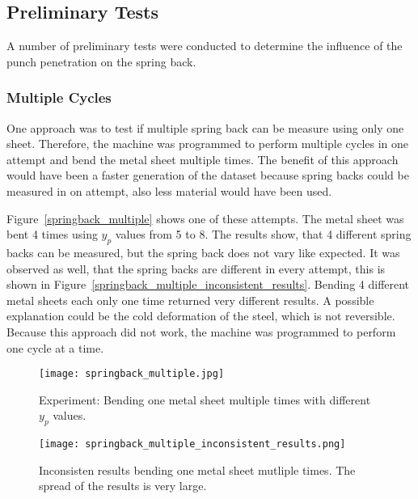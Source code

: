 \subsection{Preliminary Tests}
A number of preliminary tests were conducted to determine the influence of the punch penetration on the spring back.

\subsubsection{Multiple Cycles}
One approach was to test if multiple spring back can be measure using only one sheet.
Therefore, the machine was programmed to perform multiple cycles in one attempt and bend the metal sheet multiple
times. The benefit of this approach would have been a faster generation of the dataset because spring backs could be
measured in on attempt, also less material would have been used.

Figure~\ref{springback_multiple} shows one of these attempts. The metal sheet was bent 4 times using $y_p$ values
from 5 to 8. The results show, that 4 different spring backs can be measured, but the spring back does not vary like
expected. It was observed as well, that the spring backs are different in every attempt, this is shown in
Figure~\ref{springback_multiple_inconsistent_results}.
Bending 4 different metal sheets each only one time returned very different results.
A possible explanation could be the cold deformation of the steel, which is not reversible. Because this approach did
not work, the machine was programmed to perform one cycle at a time.

\captionsetup{width=0.45\textwidth}

\begin{figure}[H]
    \centering
    \begin{minipage}[b]{0.5\textwidth}
        \centering
        \texttt{[image: springback\_multiple.jpg]} %
        \caption{Experiment: Bending one metal sheet multiple times with different $y_p$ values.}
        \label{springback_multiple}
    \end{minipage}\hfill
    \begin{minipage}[b]{0.5\textwidth}
        \centering
        \texttt{[image: springback\_multiple\_inconsistent\_results.png]} %
        \caption{Inconsisten results bending one metal sheet mutliple times. The spread of the results is very large.}
        \label{springback_multiple_inconsistent_results}
    \end{minipage}
    \label{fig:springback_multiple_overview}
\end{figure}

